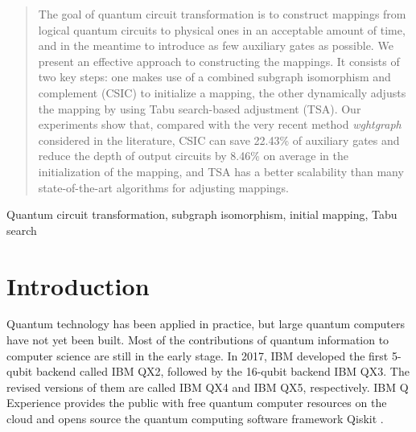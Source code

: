 \documentclass[journal]{IEEEtran}
\begin{document}
	\begin{abstract}
		The goal of quantum circuit transformation is to construct mappings from logical quantum circuits to physical ones in an acceptable amount of time, and in the meantime to introduce  as few auxiliary gates as possible. We present an effective approach to constructing the mappings. It consists of two key steps: one makes use of a combined subgraph isomorphism and complement (CSIC) to initialize a mapping, the other dynamically adjusts the mapping by using Tabu search-based adjustment (TSA). Our experiments show that, compared with the very recent method \emph{wghtgraph} considered in the literature, CSIC can save 22.43\% of auxiliary gates and reduce the depth of output circuits by 8.46\% on average in the initialization of the mapping, and  TSA has a better scalability than many state-of-the-art algorithms for adjusting mappings.
	\end{abstract}
	
	\begin{IEEEkeywords}
		Quantum circuit transformation,  subgraph isomorphism, initial mapping, Tabu search
	\end{IEEEkeywords}
	
	\IEEEpeerreviewmaketitle
	\section{Introduction}
	Quantum technology has been applied in practice, but large quantum computers have not yet been built. Most of the contributions of quantum information to computer science are still in the early stage. In 2017, IBM developed the first 5-qubit backend called IBM QX2, followed by the 16-qubit backend  IBM QX3. The revised versions of them are called IBM QX4 and IBM QX5, respectively. IBM Q Experience \cite{ibm} provides the public with free quantum computer resources on the cloud and opens source the quantum computing software framework Qiskit \cite{qiskit}. 
	
\end{document}
